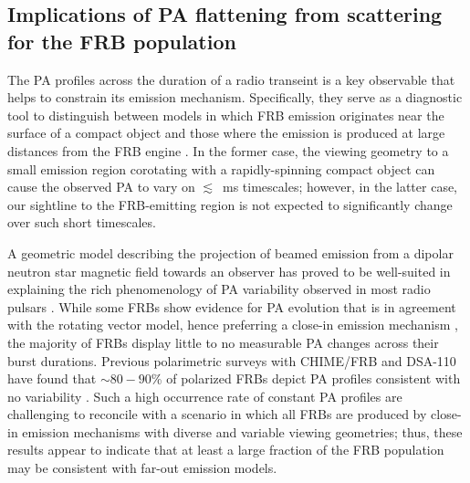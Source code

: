 \documentclass[twocolumn, linenumbers]{aastex701}
\begin{document}
\subsection{Implications of PA flattening from scattering for the FRB population} \label{sec:discussion_pa}
The PA profiles across the duration of a radio transeint is a key observable that helps to constrain its emission mechanism. Specifically, they serve as a diagnostic tool to distinguish between models in which FRB emission originates near the surface of a compact object \citep[``close-in'' models, e.g. from coherent-curvature radiation or magnetic reconnection;][]{2017MNRAS.468.2726K, 2018ApJ...868...31Y, 2020arXiv200505093L, 2021ApJ...922..166L} and those where the emission is produced at large distances from the FRB engine \citep[``far-out'' models, e.g. by synchrotron maser emission;][]{2019MNRAS.485.4091M, 2020ApJ...896..142B}. In the former case, the viewing geometry to a small emission region corotating with a rapidly-spinning compact object can cause the observed PA to vary on $\lesssim$~ms timescales; however, in the latter case, our sightline to the FRB-emitting region is not expected to significantly change over such short timescales.

A geometric model describing the projection of beamed emission from a dipolar neutron star magnetic field towards an observer \citep[i.e., the ``rotating vector model'';][]{1969ApL.....3..225R} has proved to be well-suited in explaining the rich phenomenology of PA variability observed in most radio pulsars \citep[e.g.,][]{2023MNRAS.520.4801J}. While some FRBs show evidence for PA evolution that is in agreement with the rotating vector model, hence preferring a close-in emission mechanism \citep{2025Natur.637...43M}, the majority of FRBs display little to no measurable PA changes across their burst durations. Previous polarimetric surveys with CHIME/FRB and DSA-110 have found that $\sim 80-90$\% of polarized FRBs depict PA profiles consistent with no variability \citep{2024ApJ...968...50P, 2024ApJ...964..131S}. Such a high occurrence rate of constant PA profiles are challenging to reconcile with a scenario in which all FRBs are produced by close-in emission mechanisms with diverse and variable viewing geometries; thus, these results appear to indicate that at least a large fraction of the FRB population may be consistent with far-out emission models.
\end{document}

